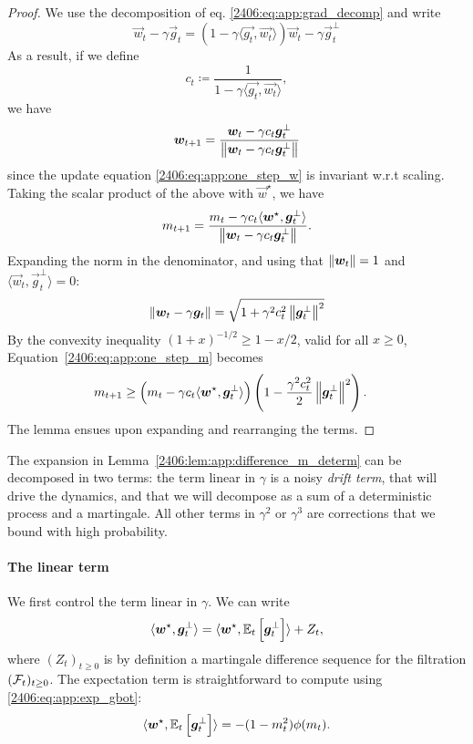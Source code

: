 \begin{proof}
    We use the decomposition of eq. \eqref{2406:eq:app:grad_decomp} and write
    \[ \vec{w}_t - \gamma \vec{g}_t = (1 - \gamma \langle \vec{g_t}, \vec{w_t} \rangle)\vec{w}_t - \gamma \vec{g}_t^\bot \]
    As a result, if we define
    \[ c_t \coloneqq \frac1{1 - \gamma \langle \vec{g_t}, \vec{w_t} \rangle}, \]
    we have
    \[ {\boldsymbol{w}}_{t+1} = \frac{{\boldsymbol{w}}_t - \gamma c_t {\boldsymbol{g}}_t^\bot}{\left\lVert {\boldsymbol{w}}_t - \gamma c_t {\boldsymbol{g}}_t^\bot\right\rVert} \]
    since the update equation \eqref{2406:eq:app:one_step_w} is invariant w.r.t scaling. Taking the scalar product of the above with $\vec{w}^\star$, we have
    \begin{equation}\label{2406:eq:app:one_step_m}
        m_{t+1} = \frac{m_t - \gamma c_t \langle {\boldsymbol{w}}^\star,{\boldsymbol{g}}_t^\bot \rangle}{\left\lVert {\boldsymbol{w}}_t - \gamma c_t {\boldsymbol{g}}_t^\bot\right\rVert}.
    \end{equation}
    Expanding the norm in the denominator, and using that $\left\lVert {\boldsymbol{w}}_t\right\rVert = 1$ and $\langle \vec{w}_t, \vec{g}_t^\bot \rangle = 0$:
    \[ \left\lVert {\boldsymbol{w}}_t - \gamma  {\boldsymbol{g}}_t\right\rVert = \sqrt{1 + \gamma^2 c_t^2 \left\lVert {\boldsymbol{g}}_t^\bot\right\rVert^2} \]
    By the convexity inequality $(1+x)^{-1/2} \geq 1 - x/2$, valid for all $x \geq 0$, Equation~\eqref{2406:eq:app:one_step_m} becomes
    \begin{align*}
        m_{t+1} &\geq \left(m_t - \gamma c_t \langle {\boldsymbol{w}}^\star,{\boldsymbol{g}}_t^\bot \rangle \right) \left( 1 - \frac{\gamma^2 c_t^2}2 \left\lVert {\boldsymbol{g}}_t^\bot\right\rVert^2 \right).
    \end{align*}
    The lemma ensues upon expanding and rearranging the terms.
\end{proof}

The expansion in Lemma~\ref{2406:lem:app:difference_m_determ} can be decomposed in two terms: the term linear in $\gamma$ is a noisy \emph{drift term}, that will drive the dynamics, and that we will decompose as a sum of a deterministic process and a martingale. All other terms in $\gamma^2$ or $\gamma^3$ are corrections that we bound with high probability.


\paragraph{The linear term} We first control the term linear in $\gamma$. We can write
\begin{equation}\label{2406:eq:app:martingale_decomp}
     \langle {\boldsymbol{w}}^\star, {\boldsymbol{g}}_t^\bot \rangle =  \langle {\boldsymbol{w}}^\star, \mathbb{E}_t\left[{\boldsymbol{g}}_t^\bot\right] \rangle + Z_t,
\end{equation}
where $(Z_t)_{t \geq 0}$ is by definition a martingale difference sequence for the filtration $(\mathcal{F}_t)_{t \geq 0}$. The expectation term is straightforward to compute using \eqref{2406:eq:app:exp_gbot}:
\begin{equation}
    \langle {\boldsymbol{w}}^\star, \mathbb{E}_t\left[{\boldsymbol{g}}_t^\bot\right] \rangle = - (1 - m_t^2) \phi(m_t). \label{2406:eq:app:drift_term}
\end{equation}


